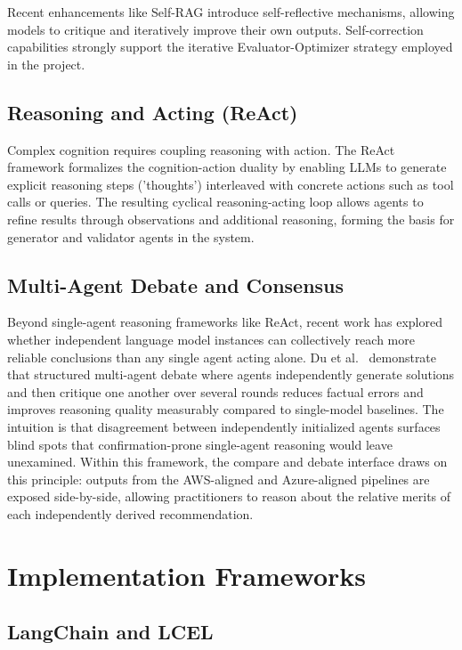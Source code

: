 Recent enhancements like Self-RAG \cite{asai2023selfrag} introduce self-reflective mechanisms, allowing models to critique and iteratively improve their own outputs. Self-correction capabilities strongly support the iterative Evaluator-Optimizer strategy employed in the project.

\subsection{Reasoning and Acting (ReAct)}

Complex cognition requires coupling reasoning with action. The ReAct framework \cite{yao2023react} formalizes the cognition-action duality by enabling LLMs to generate explicit reasoning steps ('thoughts') interleaved with concrete actions such as tool calls or queries. The resulting cyclical reasoning-acting loop allows agents to refine results through observations and additional reasoning, forming the basis for generator and validator agents in the system.

\subsection{Multi-Agent Debate and Consensus}

Beyond single-agent reasoning frameworks like ReAct, recent work has explored whether independent language model instances can collectively reach more reliable conclusions than any single agent acting alone. Du et al.~\cite{du2023improving} demonstrate that structured multi-agent debate where agents independently generate solutions and then critique one another over several rounds reduces factual errors and improves reasoning quality measurably compared to single-model baselines. The intuition is that disagreement between independently initialized agents surfaces blind spots that confirmation-prone single-agent reasoning would leave unexamined. Within this framework, the compare and debate interface draws on this principle: outputs from the AWS-aligned and Azure-aligned pipelines are exposed side-by-side, allowing practitioners to reason about the relative merits of each independently derived recommendation.

\section{Implementation Frameworks}

\subsection{LangChain and LCEL}

